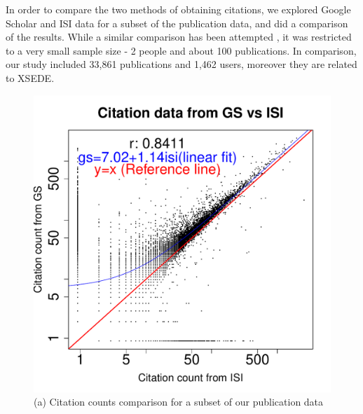 \documentclass{sig-alternate}
\begin{document}
In order to compare the two methods of obtaining citations, we explored Google Scholar and ISI data for a subset of the publication data, and did a comparison of the results. While a similar comparison has been attempted \cite{yang2006citation}, it was restricted to a very small sample size - 2 people and about 100 publications. In comparison, our study included 33,861 publications and 1,462 users, moreover they are related to XSEDE.


\begin{figure}[!htb] 
\begin{minipage}[t]{0.22\textwidth}
  \centering 
    \includegraphics[width=1.0\columnwidth]{images/11_gs_vs_isi_cites_bigfont.pdf} 
    (a) Citation counts comparison for a subset of our publication data
\ \
\end{minipage}
\begin{minipage}[t]{0.22\textwidth}
  \centering 

\end{minipage}
\end{figure}
\end{document}
